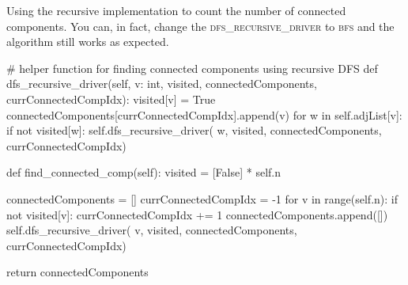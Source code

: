 \noindent Using the recursive implementation to count the number of connected components.
You can, in fact, change the \textsc{dfs\_recursive\_driver} to \textsc{bfs} and the algorithm still works as expected.

\begin{python}
    # helper function for finding connected components using recursive DFS
    def dfs_recursive_driver(self, v: int,
                             visited,
                             connectedComponents,
                             currConnectedCompIdx):
        visited[v] = True
        connectedComponents[currConnectedCompIdx].append(v)
        for w in self.adjList[v]:
            if not visited[w]:
                self.dfs_recursive_driver(
                    w, visited, connectedComponents, currConnectedCompIdx)

    def find_connected_comp(self):
        visited = [False] * self.n

        connectedComponents = []
        currConnectedCompIdx = -1
        for v in range(self.n):
            if not visited[v]:
                currConnectedCompIdx += 1
                connectedComponents.append([])
                self.dfs_recursive_driver(
                    v, visited, connectedComponents, currConnectedCompIdx)

        return connectedComponents
\end{python}

